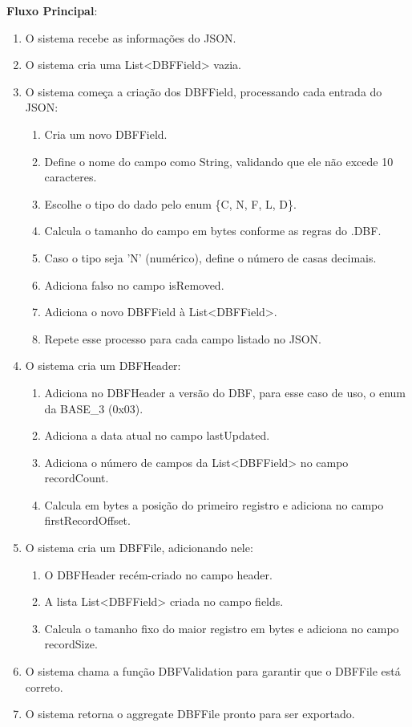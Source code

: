 \textbf{Fluxo Principal}:
\begin{enumerate}
    \item O sistema recebe as informações do JSON.
    \item O sistema cria uma List<DBFField> vazia.
    \item O sistema começa a criação dos DBFField, processando cada entrada do JSON:
    \begin{enumerate}
        \item Cria um novo DBFField.
        \item Define o nome do campo como String, validando que ele não excede 10 caracteres.
        \item Escolhe o tipo do dado pelo enum \{C, N, F, L, D\}.
        \item Calcula o tamanho do campo em bytes conforme as regras do .DBF.
        \item Caso o tipo seja 'N' (numérico), define o número de casas decimais.
        \item Adiciona falso no campo isRemoved.
        \item Adiciona o novo DBFField à List<DBFField>.
        \item Repete esse processo para cada campo listado no JSON.
    \end{enumerate}
    \item O sistema cria um DBFHeader:
    \begin{enumerate}
        \item Adiciona no DBFHeader a versão do DBF, para esse caso de uso, o enum da BASE\_3 (0x03).
        \item Adiciona a data atual no campo lastUpdated.
        \item Adiciona o número de campos da List<DBFField> no campo recordCount.
        \item Calcula em bytes a posição do primeiro registro e adiciona no campo firstRecordOffset.
    \end{enumerate}
    \item O sistema cria um DBFFile, adicionando nele:
    \begin{enumerate}
        \item O DBFHeader recém-criado no campo header.
        \item A lista List<DBFField> criada no campo fields.
        \item Calcula o tamanho fixo do maior registro em bytes e adiciona no campo recordSize.
    \end{enumerate}
    \item O sistema chama a função DBFValidation para garantir que o DBFFile está correto.
    \item O sistema retorna o aggregate DBFFile pronto para ser exportado.
\end{enumerate}

